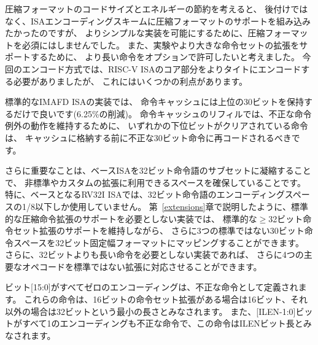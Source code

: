\begin{commentary}
圧縮フォーマットのコードサイズとエネルギーの節約を考えると、
後付けではなく、ISAエンコーディングスキームに圧縮フォーマットのサポートを組み込みたかったのですが、
よりシンプルな実装を可能にするために、圧縮フォーマットを必須にはしませんでした。
また、実験やより大きな命令セットの拡張をサポートするために、
より長い命令をオプションで許可したいと考えました。
今回のエンコード方式では、RISC-V ISAのコア部分をよりタイトにエンコードする必要がありましたが、
これにはいくつかの利点があります。

標準的なIMAFD ISAの実装では、
命令キャッシュには上位の30ビットを保持するだけで良いです(6.25\%の削減)。 命令キャッシュのリフィルでは、不正な命令例外の動作を維持するために、
いずれかの下位ビットがクリアされている命令は、
キャッシュに格納する前に不正な30ビット命令に再コードされるべきです。

さらに重要なことは、ベースISAを32ビット命令語のサブセットに凝縮することで、
非標準やカスタムの拡張に利用できるスペースを確保していることです。
特に、ベースとなるRV32I ISAでは、32ビット命令語のエンコーディングスペースの1/8以下しか使用していません。
第~\ref{extensions}章で説明したように、標準的な圧縮命令拡張のサポートを必要としない実装では、
標準的な$\geq$32ビット命令セット拡張のサポートを維持しながら、
さらに3つの標準ではない30ビット命令スペースを32ビット固定幅フォーマットにマッピングすることができます。
さらに、32ビットよりも長い命令を必要としない実装であれば、
さらに4つの主要なオペコードを標準ではない拡張に対応させることができます。
\end{commentary}

\begin{comment}
Encodings with bits [15:0] all zeros are defined as illegal
instructions.  These instructions are considered to be of minimal
length: 16 bits if any 16-bit instruction-set extension is present,
otherwise 32 bits.  The encoding with bits [ILEN-1:0] all ones is also
illegal; this instruction is considered to be ILEN bits long.
\end{comment}

ビット[15:0]がすべてゼロのエンコーディングは、不正な命令として定義されます。 
これらの命令は、16ビットの命令セット拡張がある場合は16ビット、それ以外の場合は32ビットという最小の長さとみなされます。
また、[ILEN-1:0]ビットがすべて1のエンコーディングも不正な命令で、この命令はILENビット長とみなされます。

